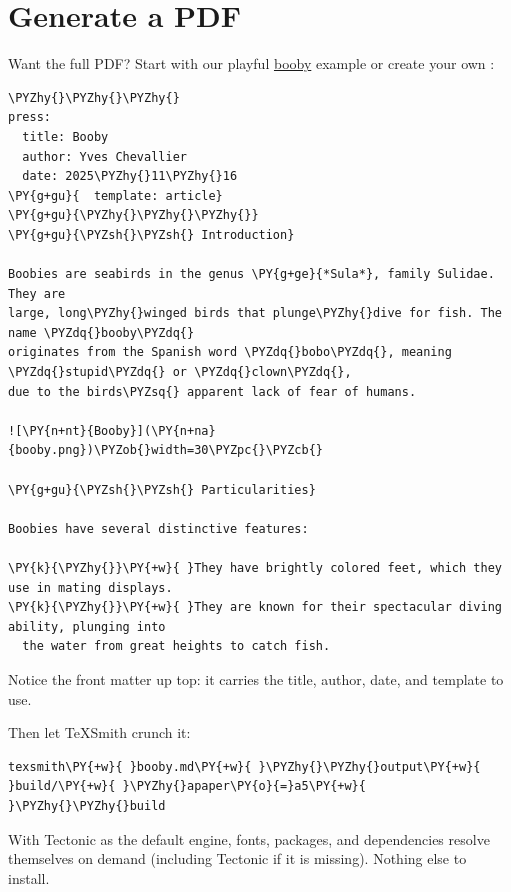 \documentclass[a4paper,twoside]{article}
\begin{document}
\section{Generate a PDF}
Want the full PDF? Start with our playful \href{https://en.wikipedia.org/wiki/Booby}{booby} example or create your own :
\begin{tscode}[lang=markdown, engine=pygments]
\begin{Verbatim}[commandchars=\\\{\},breaklines, breakanywhere, commandchars=\\\{\}]
\PYZhy{}\PYZhy{}\PYZhy{}
press:
  title: Booby
  author: Yves Chevallier
  date: 2025\PYZhy{}11\PYZhy{}16
\PY{g+gu}{  template: article}
\PY{g+gu}{\PYZhy{}\PYZhy{}\PYZhy{}}
\PY{g+gu}{\PYZsh{}\PYZsh{} Introduction}

Boobies are seabirds in the genus \PY{g+ge}{*Sula*}, family Sulidae. They are
large, long\PYZhy{}winged birds that plunge\PYZhy{}dive for fish. The name \PYZdq{}booby\PYZdq{}
originates from the Spanish word \PYZdq{}bobo\PYZdq{}, meaning \PYZdq{}stupid\PYZdq{} or \PYZdq{}clown\PYZdq{},
due to the birds\PYZsq{} apparent lack of fear of humans.

![\PY{n+nt}{Booby}](\PY{n+na}{booby.png})\PYZob{}width=30\PYZpc{}\PYZcb{}

\PY{g+gu}{\PYZsh{}\PYZsh{} Particularities}

Boobies have several distinctive features:

\PY{k}{\PYZhy{}}\PY{+w}{ }They have brightly colored feet, which they use in mating displays.
\PY{k}{\PYZhy{}}\PY{+w}{ }They are known for their spectacular diving ability, plunging into
  the water from great heights to catch fish.
\end{Verbatim}
\end{tscode}
Notice the front matter up top: it carries the title, author, date, and template to use.

Then let TeXSmith crunch it:
\begin{tscode}[lang=bash, engine=pygments]
\begin{Verbatim}[commandchars=\\\{\},breaklines, breakanywhere, commandchars=\\\{\}]
texsmith\PY{+w}{ }booby.md\PY{+w}{ }\PYZhy{}\PYZhy{}output\PY{+w}{ }build/\PY{+w}{ }\PYZhy{}apaper\PY{o}{=}a5\PY{+w}{ }\PYZhy{}\PYZhy{}build
\end{Verbatim}
\end{tscode}
With Tectonic as the default engine, fonts, packages, and dependencies resolve themselves on demand (including Tectonic if it is missing). Nothing else to install.
\end{document}
